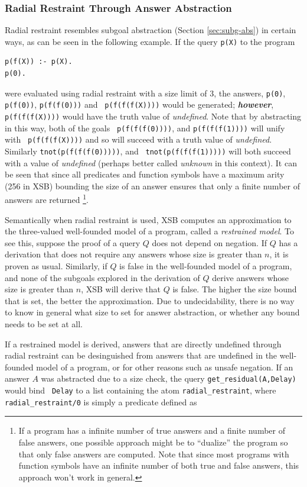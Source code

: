 \subsubsection{Radial Restraint Through Answer Abstraction}
Radial restraint resembles subgoal abstraction (Section
\ref{sec:subg-abs}) in certain ways, as can be seen in the following
example. If the query {\tt p(X)} to the program
%
\begin{verbatim}
p(f(X)) :- p(X).  
p(0).
\end{verbatim}
%
were evaluated using radial restraint with a size limit of 3, the
answers, {\tt p(0)}, {\tt p(f(0))}, {\tt p(f(f(0)))} and {\tt
  p(f(f(f(X))))} would be generated; {\bf {\em however}}, {\tt
  p(f(f(f(X))))} would have the truth value of {\em undefined}.  Note
that by abstracting in this way, both of the goals {\tt
  p(f(f(f(0))))}, and {\tt p(f(f(f(1))))} will unify with {\tt
  p(f(f(f(X))))} and so will succeed with a truth value of {\em
  undefined}.  Similarly {\tt tnot(p(f(f(f(0)))))}, and {\tt
  tnot(p(f(f(f(1)))))} will both succeed with a value of {\em
  undefined} (perhaps better called {\em unknown} in this context).
%
It can be seen that since all predicates and function symbols have a
maximum arity (256 in XSB) bounding the size of an answer ensures that
only a finite number of answers are returned
\footnote{If a program has a infinite number of true answers and a
  finite number of false answers, one possible approach might be to
  ``dualize'' the program so that only false answers are computed.
  Note that since most programs with function symbols have an infinite
  number of both true and false answers, this approach won't work in
  general.}.

Semantically when radial restraint is used, XSB computes an
approximation to the three-valued well-founded model of a program,
called a {\em restrained model}.  To see this, suppose the proof of a
query $Q$ does not depend on negation.  If $Q$ has a derivation that
does not require any answers whose size is greater than $n$, it is
proven as usual.  Similarly, if $Q$ is false in the well-founded model
of a program, and none of the subgoals explored in the derivation of
$Q$ derive answers whose size is greater than $n$, XSB will derive
that $Q$ is false.  The higher the size bound that is set, the better
the approximation.  Due to undecidability, there is no way to know in
general what size to set for answer abstraction, or whether any bound
needs to be set at all.

If a restrained model is derived, answers that are directly undefined
through radial restraint can be desinguished from answers that are
undefined in the well-founded model of a program, or for other reasons
such as unsafe negation.  If an answer $A$ was abstracted due to a
size check, the query {\tt get\_residual(A,Delay)} would bind {\tt
  Delay} to a list containing the atom {\tt radial\_restraint}, where
{\tt radial\_restraint/0} is simply a predicate defined as

